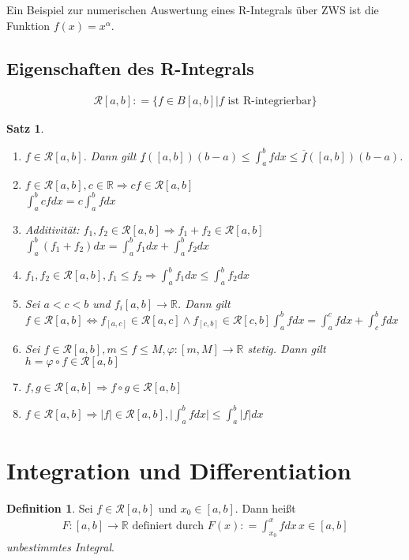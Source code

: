 \documentclass[ngerman,titlepage,twoside, parskip=half*]{scrreprt}
\newcommand*{\R}{\mathbb{R}}
\newcommand*{\RR}{\mathcal{R}}
\theoremstyle{plain}
\newtheorem{theorem}{Satz}[section]
\theoremstyle{definition}
\newtheorem{definition}{Definition}
\theoremstyle{remark}
\newcommand*{\abs}[2][]{#1\lvert#2#1\rvert}
\newcommand*{\coloneqq}{\mathrel{\mathop:}=}
\begin{document}
Ein Beispiel zur numerischen Auswertung eines R-Integrals über ZWS ist die
Funktion $f(x)=x^\alpha$.

\subsection{Eigenschaften des R-Integrals}
\begin{gather*}\RR[a,b]\coloneqq\{f\in B[a,b] | f \text{ ist R-integrierbar}\}\end{gather*}

\begin{theorem}
  \begin{enumerate}
    \item $f\in\RR[a,b]$. Dann gilt $\underline{f}([a,b])(b-a)\leq\int_a^b
      fdx\leq \overline{f}([a,b])(b-a)$.
    \item $f\in\RR[a,b], c\in\R\Rightarrow cf\in\RR[a,b]$\\
      $\int_a^b cfdx=c\int_a^b fdx$
    \item Additivität: $f_1,f_2\in\RR[a,b]\Rightarrow f_1+f_2\in\RR[a,b]$\\
      $\int_a^b (f_1+f_2)dx=\int_a^b f_1dx + \int_a^b f_2dx$
    \item $f_1,f_2\in\RR[a,b], f_1\leq f_2\Rightarrow \int_a^b f_1dx\leq 
      \int_a^b f_2dx$
    \item Sei $a<c<b$ und $f_i[a,b]\rightarrow\R$. Dann gilt $f\in\RR[a,b]
      \Leftrightarrow f_{[a,c]}\in\RR[a,c]\wedge f_{[c,b]}\in\RR[c,b]
      \int_a^b fdx=\int_a^c fdx + \int_c^b fdx$
    \item Sei $f\in\RR[a,b], m\leq f\leq M, \varphi\colon[m,M]\rightarrow\R$ stetig.
      Dann gilt $h=\varphi\circ f\in\RR[a,b]$
    \item $f,g\in\RR[a,b]\Rightarrow f\circ g \in\RR[a,b]$
    \item $f\in\RR[a,b]\Rightarrow \abs{f}\in\RR[a,b], \abs{\int_a^b fdx}\leq\int_a^b
      \abs{f}dx$
  \end{enumerate}
\end{theorem}

\section{Integration und Differentiation}

\begin{definition}
  Sei $f\in\RR[a,b]$ und $x_0\in[a,b]$. Dann heißt
  \begin{gather*}F\colon[a,b]\rightarrow\R\text{ definiert durch }
  F(x)\coloneqq\int_{x_0}^x fdx\,x\in[a,b]\end{gather*}
  \emph{unbestimmtes Integral}.
\end{definition}
\end{document}
